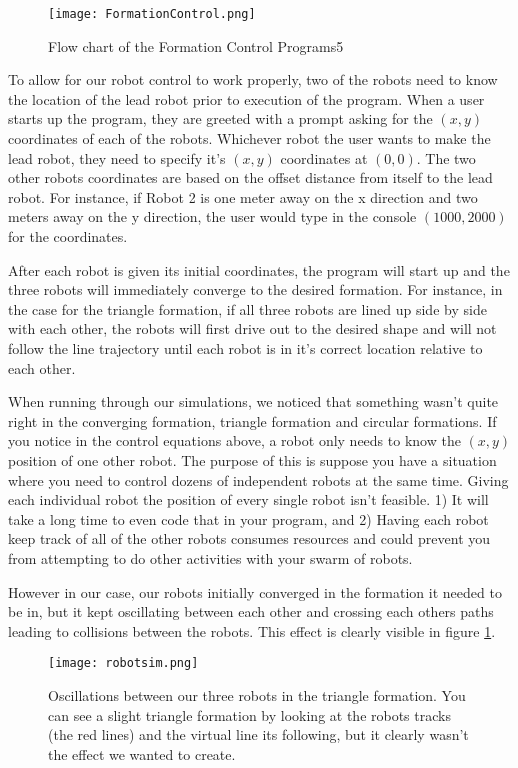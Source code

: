 \documentclass[12pt]{article}
\begin{document}
\begin{figure}[htp!]
	\begin{center}
		\texttt{[image: FormationControl.png]}
		\caption{Flow chart of the Formation Control Programs5}
	\end{center}
\end{figure}

To allow for our robot control to work properly, two of the robots need to know the location of the lead robot prior to execution of the program. When a user starts up the program, they are greeted with a prompt asking for the $(x,y)$ coordinates of each of the robots. Whichever robot the user wants to make the lead robot, they need to specify it's $(x,y)$ coordinates at $(0,0)$. The two other robots coordinates are based on the offset distance from itself to the lead robot. For instance, if Robot 2 is one meter away on the x direction and two meters away on the y direction, the user would type in the console $(1000,2000)$ for the coordinates.

After each robot is given its initial coordinates, the program will start up and the three robots will immediately converge to the desired formation. For instance, in the case for the triangle formation, if all three robots are lined up side by side with each other, the robots will first drive out to the desired shape and will not follow the line trajectory until each robot is in it's correct location relative to each other. 

When running through our simulations, we noticed that something wasn't quite right in the converging formation, triangle formation and circular formations. If you notice in the control equations above, a robot only needs to know the $(x,y)$ position of one other robot. The purpose of this is suppose you have a situation where you need to control dozens of independent robots at the same time. Giving each individual robot the position of every single robot isn't feasible. 1) It will take a long time to even code that in your program, and 2) Having each robot keep track of all of the other robots consumes resources and could prevent you from attempting to do other activities with your swarm of robots. 

However in our case, our robots initially converged in the formation it needed to be in, but it kept oscillating between each other and crossing each others paths leading to collisions between the robots. 
This effect is clearly visible in figure \ref{fig.badrobot}.

\begin{figure}[htp!]
	\begin{center}
		\texttt{[image: robotsim.png]}
		\caption{Oscillations between our three robots in the triangle formation. You can see a slight triangle formation by looking at the robots tracks (the red lines) and the virtual line its following, but it clearly wasn't the effect we wanted to create.} \label{fig.badrobot}
	\end{center}
\end{figure}
\end{document}
